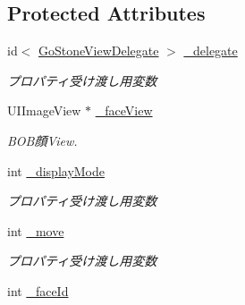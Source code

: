 \subsection*{Protected Attributes}
\begin{DoxyCompactItemize}
\item 
\hypertarget{interface_go_stone_view_ad31ada7f49d4137e45959e4fd021582b}{
id$<$ \hyperlink{protocol_go_stone_view_delegate-p}{GoStoneViewDelegate} $>$ \hyperlink{interface_go_stone_view_ad31ada7f49d4137e45959e4fd021582b}{\_\-delegate}}
\label{interface_go_stone_view_ad31ada7f49d4137e45959e4fd021582b}

\begin{DoxyCompactList}\small\item\em プロパティ受け渡し用変数 \end{DoxyCompactList}\item 
\hypertarget{interface_go_stone_view_aa993bdd572a42ccd1c099607c808ef6c}{
UIImageView $\ast$ \hyperlink{interface_go_stone_view_aa993bdd572a42ccd1c099607c808ef6c}{\_\-faceView}}
\label{interface_go_stone_view_aa993bdd572a42ccd1c099607c808ef6c}

\begin{DoxyCompactList}\small\item\em BOB顔View. \end{DoxyCompactList}\item 
\hypertarget{interface_go_stone_view_ade32c856499a9ca1088ad729dc3a2dfd}{
int \hyperlink{interface_go_stone_view_ade32c856499a9ca1088ad729dc3a2dfd}{\_\-displayMode}}
\label{interface_go_stone_view_ade32c856499a9ca1088ad729dc3a2dfd}

\begin{DoxyCompactList}\small\item\em プロパティ受け渡し用変数 \end{DoxyCompactList}\item 
\hypertarget{interface_go_stone_view_a5fa23d46b02c33eb5c8c924b4e3ae1a1}{
int \hyperlink{interface_go_stone_view_a5fa23d46b02c33eb5c8c924b4e3ae1a1}{\_\-move}}
\label{interface_go_stone_view_a5fa23d46b02c33eb5c8c924b4e3ae1a1}

\begin{DoxyCompactList}\small\item\em プロパティ受け渡し用変数 \end{DoxyCompactList}\item 
\hypertarget{interface_go_stone_view_a7ee54d867b18882b40c8b61c72fdbd62}{
int \hyperlink{interface_go_stone_view_a7ee54d867b18882b40c8b61c72fdbd62}{\_\-faceId}}
\label{interface_go_stone_view_a7ee54d867b18882b40c8b61c72fdbd62}


\end{DoxyCompactItemize}

